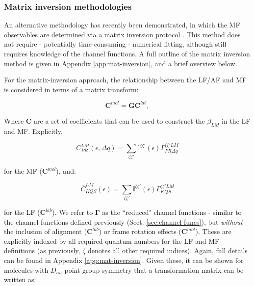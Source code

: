 \documentclass[10pt]{article}
\begin{document}
\subsubsection{Matrix inversion methodologies\label{sec:matrix-inv-intro}}

An alternative methodology has recently been demonstrated, in which the MF observables are determined via a matrix inversion protocol \cite{gregory2021MolecularFramePhotoelectron}. This method does not require - potentially time-consuming - numerical fitting, although still requires knowledge of the channel functions. A full outline of the matrix inversion method is given in Appendix \ref{app:mat-inversion}, and a brief overview below.

For the matrix-inversion approach, the relationship between the LF/AF and MF is considered in terms of a matrix transform:

\begin{equation}
\mathbf{C}^{mol}=\mathbf{G}\mathbf{C}^{lab},\label{eq:basic}
\end{equation}

Where $\mathbf{C}$ are a set of coefficients that can be used to construct the $\beta_{LM}$ in the LF and MF. Explicitly, 


\begin{equation}
C_{PR}^{LM}(\epsilon,\Delta q)=\sum_{\zeta\zeta'}\mathbb{I}^{\zeta\zeta'}(\epsilon)\Gamma_{PR\Delta q}^{\zeta\zeta'LM}
\end{equation}

for the MF ($\mathbf{C}^{mol}$), and:

\begin{equation}
\bar{C}_{KQS}^{LM}(\epsilon)=\sum_{\zeta\zeta'}\mathbb{I}^{\zeta\zeta'}(\epsilon)\Gamma_{KQS}^{\zeta\zeta'LM}
\label{eq:C-AF}
\end{equation}

for the LF ($\mathbf{C}^{lab}$). We refer to $\mathbf{\Gamma}$ as the ``reduced" channel functions - similar to the channel functions defined previously (Sect. \ref{sec:channel-funcs}), but \textit{without} the inclusion of alignment ($\mathbf{C}^{lab}$) or frame rotation effects ($\mathbf{C}^{mol}$). These are explicitly indexed by all required quantum numbers for the LF and MF definitions (as previously, $\zeta$ denotes all other required indices). Again, full details can be found in Appendix \ref{app:mat-inversion}. Given these, it can be shown for molecules with $D_{nh}$ point group symmetry that a transformation matrix can be written as:
\end{document}
